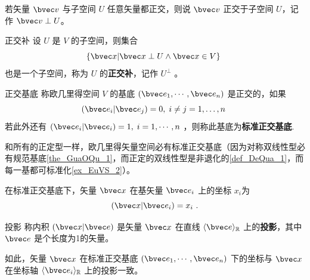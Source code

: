 若矢量 $\bvec v$ 与子空间 $U$ 任意矢量都正交，则说 $\bvec v$ 正交于子空间 $U$，记作 $\bvec v\perp U$。
\begin{definition}{正交补}
设 $U$ 是 $V$ 的子空间，则集合
\begin{equation}
\{\bvec x|\bvec x\perp U\wedge\bvec x\in V\}~
\end{equation}
也是一个子空间，称为 $U$ 的\textbf{正交补}，记作 $U^{\perp}$ 。
\end{definition}
\begin{definition}{正交基底}
称欧几里得空间 $V$ 的基底 $(\bvec e_1,\cdots,\bvec e_n)$ 是正交的，如果
\begin{equation}
(\bvec e_i|\bvec e_j)=0,\;i\neq j=1,\dots,n~
\end{equation}
若此外还有 $(\bvec e_i|\bvec e_i)=1,\;i=1,\cdots ,n$ ，则称此基底为\textbf{标准正交基底}.
\end{definition}

和所有的正定型一样，欧几里得矢量空间必有标准正交基底（因为对称双线性型必有规范基底\autoref{the_GuaOQu_1}，而正定的双线性型是非退化的\autoref{def_DeQua_1}，而每一基都可标准化\autoref{ex_EuVS_2}）。
\begin{exercise}{}
在标准正交基底下，矢量 $\bvec x$ 在基矢量 $\bvec e_i$ 上的坐标 $x_i$为
\begin{equation}
(\bvec x|\bvec e_i)=x_i~.
\end{equation}
\end{exercise}
\begin{definition}{投影}
称内积 $(\bvec x|\bvec e)$ 是矢量 $\bvec x$ 在直线 $\langle\bvec e\rangle_{\mathbb R}$ 上的\textbf{投影}，其中 $\bvec e$ 是个长度为1的矢量。  
\end{definition}
如此，矢量 $\bvec x$ 在标准正交基底 $(\bvec e_1,\cdots,\bvec e_n)$ 下的坐标与 $\bvec x$ 在坐标轴 $\langle\bvec e_i\rangle_\mathbb{R}$ 上的投影一致。 
